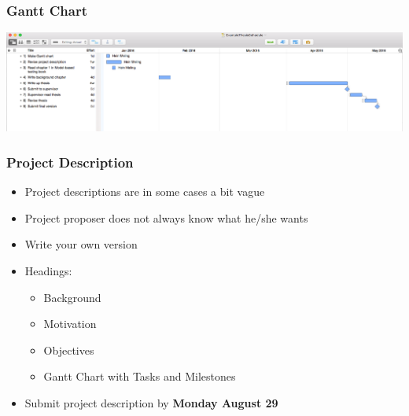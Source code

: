 \documentclass[hyperref={pdfpagelabels=false}, aspectratio=1610]{beamer}
\begin{document}
\begin{frame}
\frametitle{Gantt Chart}
 \begin{center}
  \includegraphics[scale=0.25]{fig/gantt-example}
 \end{center}
\end{frame}


\begin{frame}
\frametitle{Project Description}
\begin{block}{}
 \begin{itemize}
  \item Project descriptions are in some cases a bit vague
  \item Project proposer does not always know what he/she wants
  \item Write your own version
  \item Headings:
  \begin{itemize}
  	\item Background
	\item Motivation
	\item Objectives
	\item Gantt Chart with Tasks and Milestones
  \end{itemize}
  \item Submit project description by \textbf{Monday August 29}
 \end{itemize}
\end{block}
\end{frame}
\end{document}
